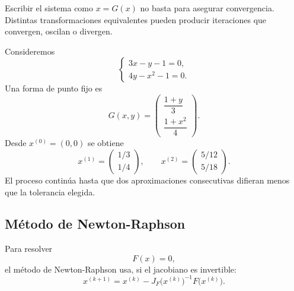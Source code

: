 \documentclass[a4,11pt]{aleph-notas}
\begin{document}
\begin{advertencia}
    Escribir el sistema como ${x}={G}({x})$ no basta para asegurar convergencia. Distintas transformaciones equivalentes pueden producir iteraciones que convergen, oscilan o divergen.
\end{advertencia}

\begin{ejem}
    Consideremos
    \[
        \begin{cases}
            3x-y-1=0,\\
            4y-x^2-1=0.
        \end{cases}
    \]
    Una forma de punto fijo es
    \[
        {G}(x,y)=
        \begin{pmatrix}
            \dfrac{1+y}{3}\\[2mm]
            \dfrac{1+x^2}{4}
        \end{pmatrix}.
    \]
    Desde ${x}^{(0)}=(0,0)$ se obtiene
    \[
        {x}^{(1)}=
        \begin{pmatrix}
            1/3\\
            1/4
        \end{pmatrix},
        \qquad
        {x}^{(2)}=
        \begin{pmatrix}
            5/12\\
            5/18
        \end{pmatrix}.
    \]
    El proceso continúa hasta que dos aproximaciones consecutivas difieran menos que la tolerancia elegida.
\end{ejem}

\subsection{Método de Newton-Raphson}

\begin{defi}
    Para resolver
    \[
        {F}({x})={0},
    \]
    el método de Newton-Raphson usa, si el jacobiano es invertible:
    \[
        {x}^{(k+1)}
        =
        {x}^{(k)}
        -
        J_{{F}}\bigl({x}^{(k)}\bigr)^{-1}
        {F}\bigl({x}^{(k)}\bigr).
    \]
\end{defi}
\end{document}
